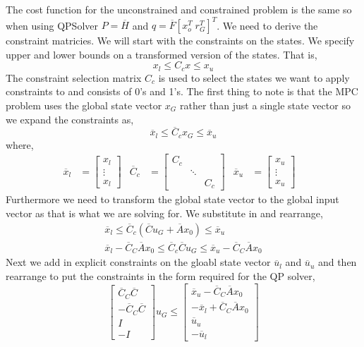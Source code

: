 \documentclass{article}
\newcommand{\doublebar}[1]{\overline{#1}}
\begin{document}
The cost function for the unconstrained and constrained problem is the same so when using QPSolver $P=\doublebar{H}$
and $q=\doublebar{F}\left[x_o^T \; r_G^T\right]^T$. We need to derive the constraint matricies. We will start with the
constraints on the states. We specify upper and lower bounds on a transformed version of the states. That is,
\begin{equation}
    x_l \leq C_cx \leq x_u
\end{equation}
The constraint selection matrix $C_c$ is used to select the states we want to apply constraints to and consists of 0's
and 1's. The first thing to note is that the MPC problem uses the global state vector $x_G$ rather than just a single
state vector so we expand the constraints as,
\begin{equation}
    \doublebar{x}_l \leq \doublebar{C}_cx_G \leq \doublebar{x}_u
\end{equation}
where,
\begin{align}
    \doublebar{x}_l &= \begin{bmatrix} x_l \\ \vdots \\ x_l \end{bmatrix} &
    \doublebar{C}_c &= \begin{bmatrix} C_c & & \\  & \ddots &  \\ & & C_c \end{bmatrix} &
    \doublebar{x}_u &= \begin{bmatrix} x_u \\ \vdots \\ x_u \end{bmatrix} &
\end{align}
Furthermore we need to transform the global state vector to the global input vector as that is what we are solving for.
We substitute in  and rearrange,
\begin{align}
    \doublebar{x}_l \leq \doublebar{C}_c\left(\doublebar{C}u_G + \doublebar{A}x_0\right) \leq \doublebar{x}_u \\
    \doublebar{x}_l - \doublebar{C}_C\doublebar{A}x_0 \leq \doublebar{C}_c\doublebar{C}u_G \leq \doublebar{x}_u -
    \doublebar{C}_C\doublebar{A}x_0
\end{align}
Next we add in explicit constraints on the gloabl state vector $\doublebar{u}_l$ and $\doublebar{u}_u$ and then
rearrange to put the constraints in the form required for the QP solver,
\begin{equation}
    \begin{bmatrix} \doublebar{C}_C\doublebar{C} \\ -\doublebar{C}_C\doublebar{C} \\ I \\ -I \end{bmatrix} u_G
    \leq
    \begin{bmatrix}
        \doublebar{x}_u - \doublebar{C}_C\doublebar{A}x_0 \\ -\doublebar{x}_l + \doublebar{C}_C\doublebar{A}x_0 \\
        \doublebar{u}_u \\
        -\doublebar{u}_l
    \end{bmatrix}
\end{equation}
\end{document}
